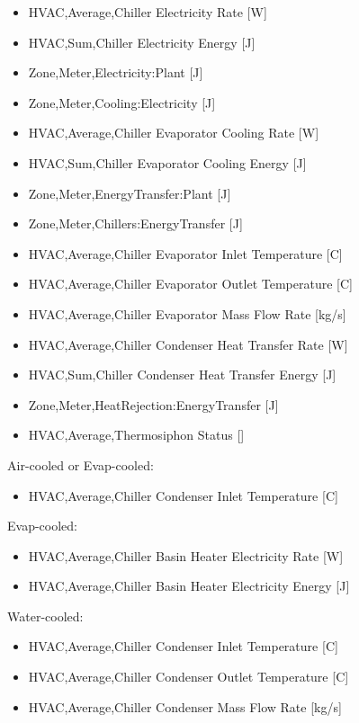 \begin{itemize}
    \item
    HVAC,Average,Chiller Electricity Rate {[}W{]}
    \item
    HVAC,Sum,Chiller Electricity Energy {[}J{]}
    \item
    Zone,Meter,Electricity:Plant {[}J{]}
    \item
    Zone,Meter,Cooling:Electricity {[}J{]}
    \item
    HVAC,Average,Chiller Evaporator Cooling Rate {[}W{]}
    \item
    HVAC,Sum,Chiller Evaporator Cooling Energy {[}J{]}
    \item
    Zone,Meter,EnergyTransfer:Plant {[}J{]}
    \item
    Zone,Meter,Chillers:EnergyTransfer {[}J{]}
    \item
    HVAC,Average,Chiller Evaporator Inlet Temperature {[}C{]}
    \item
    HVAC,Average,Chiller Evaporator Outlet Temperature {[}C{]}
    \item
    HVAC,Average,Chiller Evaporator Mass Flow Rate {[}kg/s{]}
    \item
    HVAC,Average,Chiller Condenser Heat Transfer Rate {[}W{]}
    \item
    HVAC,Sum,Chiller Condenser Heat Transfer Energy {[}J{]}
    \item
    Zone,Meter,HeatRejection:EnergyTransfer {[}J{]}
    \item
    HVAC,Average,Thermosiphon Status {[]}
\end{itemize}

Air-cooled or Evap-cooled:

\begin{itemize}
    \tightlist
    \item
    HVAC,Average,Chiller Condenser Inlet Temperature {[}C{]}
\end{itemize}

Evap-cooled:

\begin{itemize}
    \item
    HVAC,Average,Chiller Basin Heater Electricity Rate {[}W{]}
    \item
    HVAC,Average,Chiller Basin Heater Electricity Energy {[}J{]}
\end{itemize}

Water-cooled:

\begin{itemize}
    \item
    HVAC,Average,Chiller Condenser Inlet Temperature {[}C{]}
    \item
    HVAC,Average,Chiller Condenser Outlet Temperature {[}C{]}
    \item
    HVAC,Average,Chiller Condenser Mass Flow Rate {[}kg/s{]}
\end{itemize}

